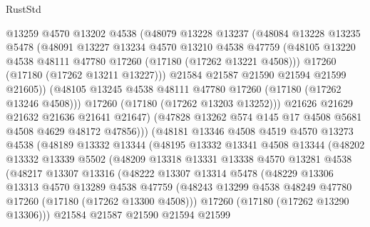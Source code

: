 \begin{lexlean}{RustStd}
\begin{coremodule}
                  @13259
                  @4570
                  @13202
                  @4538
                  (@48079
                    @13228
                    @13237
                    (@48084
                      @13228
                      @13235
                      @5478
                      (@48091
                        @13227
                        @13234
                        @4570
                        @13210
                        @4538
                        @47759
                        (@48105 @13220 @4538 @48111 @47780 @17260 (@17180 (@17262 @13221 @4508)))
                        @17260
                        (@17180 (@17262 @13211 @13227)))
                      @21584
                      @21587
                      @21590
                      @21594
                      @21599
                      @21605))
                  (@48105 @13245 @4538 @48111 @47780 @17260 (@17180 (@17262 @13246 @4508)))
                  @17260
                  (@17180 (@17262 @13203 @13252)))
                @21626
                @21629
                @21632
                @21636
                @21641
                @21647)
              (@47828 @13262 @574 @145 @17 @4508 @5681 @4508 @4629 @48172 @47856)))
          (@48181
            @13346
            @4508
            @4519
            @4570
            @13273
            @4538
            (@48189
              @13332
              @13344
              (@48195
                @13332
                @13341
                @4508
                @13344
                (@48202
                  @13332
                  @13339
                  @5502
                  (@48209
                    @13318
                    @13331
                    @13338
                    @4570
                    @13281
                    @4538
                    (@48217
                      @13307
                      @13316
                      (@48222
                        @13307
                        @13314
                        @5478
                        (@48229
                          @13306
                          @13313
                          @4570
                          @13289
                          @4538
                          @47759
                          (@48243 @13299 @4538 @48249 @47780 @17260 (@17180 (@17262 @13300 @4508)))
                          @17260
                          (@17180 (@17262 @13290 @13306)))
                        @21584
                        @21587
                        @21590
                        @21594
                        @21599

\end{coremodule}
\end{lexlean}
